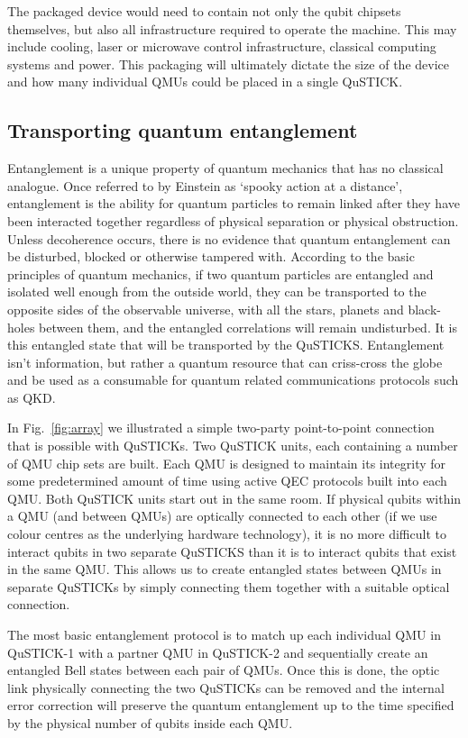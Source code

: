 \documentclass[twocolumn, aps, rmp, amsmath, amssymb, nofootinbib, superscriptaddress, longbibliography, floatfix, table-of-contents, eqsecnum]{revtex4-2}
\begin{document}
The packaged device would need to contain not only the qubit chipsets themselves, but also all infrastructure required to operate the machine. This may include cooling, laser or microwave control infrastructure, classical computing systems and power. This packaging will ultimately dictate the size of the device and how many individual QMUs could be placed in a single QuSTICK.

\subsection{Transporting quantum entanglement}

Entanglement is a unique property of quantum mechanics that has no classical analogue. Once referred to by Einstein as `spooky action at a distance', entanglement is the ability for quantum particles to remain linked after they have been interacted together regardless of physical separation or physical obstruction. Unless decoherence occurs, there is no evidence that quantum entanglement can be disturbed, blocked or otherwise tampered with. According to the basic principles of quantum mechanics, if two quantum particles are entangled and isolated well enough from the outside world, they can be transported to the opposite sides of the observable universe, with all the stars, planets and black-holes between them, and the entangled correlations will remain undisturbed. It is this entangled state that will be transported by the QuSTICKS. Entanglement isn't information, but rather a quantum resource that can criss-cross the globe and be used as a consumable for quantum related communications protocols such as QKD. 

In Fig.~\ref{fig:array} we illustrated a simple two-party point-to-point connection that is possible with QuSTICKs. Two QuSTICK units, each containing a number of QMU chip sets are built. Each QMU is designed to maintain its integrity for some predetermined amount of time using active QEC protocols built into each QMU. Both QuSTICK units start out in the same room. If physical qubits within a QMU (and between QMUs) are optically connected to each other (if we use colour centres as the underlying hardware technology), it is no more difficult to interact qubits in two separate QuSTICKS than it is to interact qubits that exist in the same QMU. This allows us to create entangled states between QMUs in separate QuSTICKs by simply connecting them together with a suitable optical connection. 

The most basic entanglement protocol is to match up each individual QMU in QuSTICK-1 with a partner QMU in QuSTICK-2 and sequentially create an entangled Bell states between each pair of QMUs. Once this is done, the optic link physically connecting the two QuSTICKs can be removed and the internal error correction will preserve the quantum entanglement up to the time specified by the physical number of qubits inside each QMU.
\end{document}
